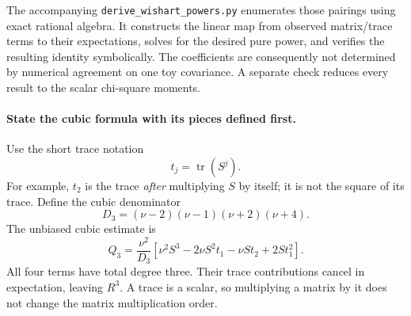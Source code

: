 \documentclass[11pt]{article}
\begin{document}
The accompanying \texttt{derive\_wishart\_powers.py} enumerates those
pairings using exact rational algebra. It constructs the linear map from
observed matrix/trace terms to their expectations, solves for the desired
pure power, and verifies the resulting identity symbolically. The coefficients
are consequently not determined by numerical agreement on one toy covariance.
A separate check reduces every result to the scalar chi-square moments.

\paragraph{State the cubic formula with its pieces defined first.}
Use the short trace notation
\begin{equation}
 t_j=\operatorname{tr}(S^j).
\end{equation}
For example, $t_2$ is the trace \emph{after} multiplying $S$ by itself; it is
not the square of its trace. Define the cubic denominator
\begin{equation}
 D_3=(\nu-2)(\nu-1)(\nu+2)(\nu+4).
\end{equation}
The unbiased cubic estimate is
\begin{equation}
 Q_3=\frac{\nu^2}{D_3}
 \left[\nu^2S^3-2\nu S^2t_1-\nu S t_2+2S t_1^2\right].
 \label{eq:unbiased-cube}
\end{equation}
All four terms have total degree three. Their trace contributions cancel
in expectation, leaving $R^3$. A trace is a scalar, so multiplying a matrix
by it does not change the matrix multiplication order.
\end{document}
